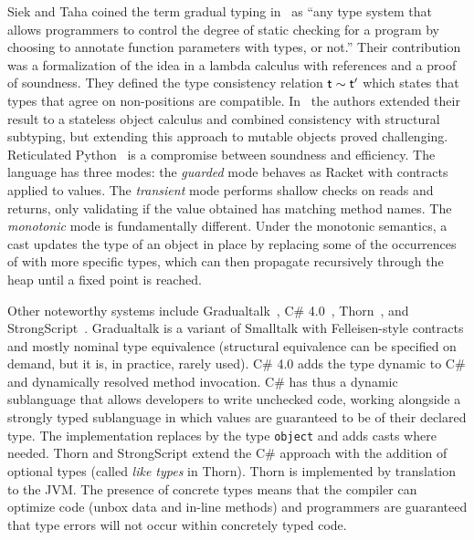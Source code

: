 \documentclass{tex/llncs}
\begin{document}
Siek and Taha coined the term gradual typing in~\cite{SiekTaha06} as ``any
type system that allows programmers to control the degree of static checking
for a program by choosing to annotate function parameters with types, or
not.'' Their contribution was a formalization of the idea in a lambda
calculus with references and a proof of soundness. They defined the type
consistency relation $\t \sim \tp$ which states that types that agree on
non-\any positions are compatible.  In~\cite{SiekTaha07} the authors
extended their result to a stateless object calculus and combined
consistency with structural subtyping, but extending this approach to
mutable objects proved challenging.  Reticulated Python~\cite{siek14} is a
compromise between soundness and efficiency.  The language has three modes:
the \emph{guarded} mode behaves as Racket with contracts applied to values.
The \emph{transient} mode performs shallow checks on reads and returns, only
validating if the value obtained has matching method names.  The
\emph{monotonic} mode is fundamentally different. Under the monotonic
semantics, a cast updates the type of an object in place by replacing some
of the occurrences of \any with more specific types, which can then
propagate recursively through the heap until a fixed point is reached.

Other noteworthy systems include Gradualtalk~\cite{GS13}, C\#
4.0~\cite{Bierman10}, Thorn~\cite{oopsla09}, and
StrongScript~\cite{ecoop15}. Gradualtalk is a variant of Smalltalk with
Felleisen-style contracts and mostly nominal type equivalence (structural
equivalence can be specified on demand, but it is, in practice, rarely
used). C\# 4.0 adds the type {\sf dynamic} to C\# and dynamically resolved
method invocation.  C\# has thus a dynamic sublanguage that allows
developers to write unchecked code, working alongside a strongly typed
sublanguage in which values are guaranteed to be of their declared type.
The implementation replaces \any by the type {\tt object} and adds casts
where needed.  Thorn and StrongScript extend the C\# approach with the
addition of optional types (called {\em like types} in Thorn).  Thorn is
implemented by translation to the JVM. The presence of concrete types means
that the compiler can optimize code (unbox data and in-line methods) and
programmers are guaranteed that type errors will not occur within concretely
typed code.

\newcommand{\rot}[1]{\rotatebox{80}{#1}}
\newcommand{\X}{\EM{\bullet}}
\newcommand{\XX}{\EM{\bullet^{(2)}}}
\newcommand{\XY}{\EM{\bullet^{(1)}}}
\end{document}
